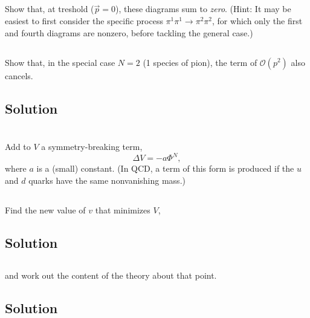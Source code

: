 \subsection{}
Show that, at treshold ($\vec{p} = 0$), these diagrams sum to \emph{zero}. (Hint: It may be easiest to first consider the specific process $\pi^1 \pi^1 \to \pi^2 \pi^2$, for which only the first and fourth diagrams are nonzero, before tackling the general case.)






\subsection{}
Show that, in the special case $N = 2$ (1 species of pion), the term of $\mathcal{O}(p^2)$ also cancels.


\subsection*{Solution}



\section{}
Add to $V$ a symmetry-breaking term,
\begin{equation*}
	\Delta V = - a \Phi^N,
\end{equation*}
where $a$ is a (small) constant. (In QCD, a term of this form is produced if the $u$ and $d$ quarks have the same nonvanishing mass.)

\subsection{}
Find the new value of $v$ that minimizes $V$,

\subsection*{Solution}


\subsection{}
and work out the content of the theory about that point.

\subsection*{Solution}


